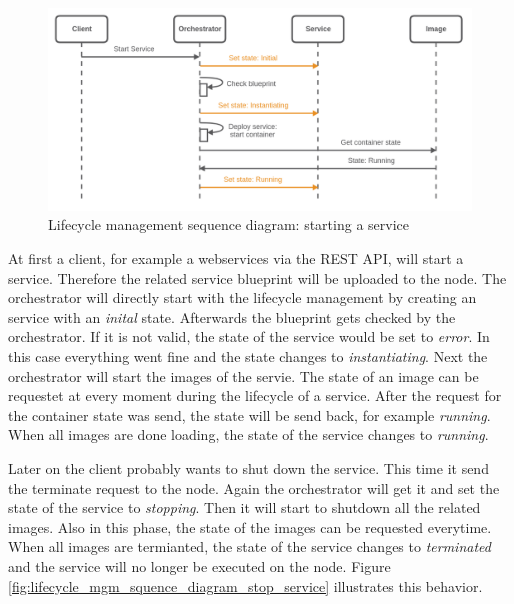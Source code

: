 \begin{figure}[H]
    \centering
    \includegraphics[width=\textwidth]{resources/images/lifecycle_sequence_diagram_start_service.png}
    \caption[Lifecycle management sequence diagram: starting a service]{Lifecycle management sequence diagram: starting a service}
    \label{fig:lifecycle_mgm_squence_diagram_start_service}
\end{figure}

At first a client, for example a webservices via the \ac{REST} \ac{API}, will start a service.
Therefore the related service blueprint will be uploaded to the node.
The orchestrator will directly start with the lifecycle management by creating an service with an \textit{inital} state.
Afterwards the blueprint gets checked by the orchestrator.
If it is not valid, the state of the service would be set to \textit{error}.
In this case everything went fine and the state changes to \textit{instantiating}.
Next the orchestrator will start the images of the servie.
The state of an image can be requestet at every moment during the lifecycle of a service.
After the request for the container state was send, the state will be send back, for example \textit{running}.
When all images are done loading, the state of the service changes to \textit{running}.

Later on the client probably wants to shut down the service.
This time it send the terminate request to the node.
Again the orchestrator will get it and set the state of the service to \textit{stopping}.
Then it will start to shutdown all the related images.
Also in this phase, the state of the images can be requested everytime.
When all images are termianted, the state of the service changes to \textit{terminated} and the service will no longer be executed on the node.
Figure \ref{fig:lifecycle_mgm_squence_diagram_stop_service} illustrates this behavior.

